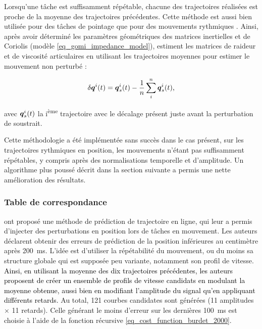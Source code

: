 Lorsqu'une tâche est suffisamment répétable, chacune des trajectoires réalisées est proche de la moyenne des trajectoires précédentes. Cette méthode est aussi bien utilisée pour des tâches de pointage \parencite{gomi_human_1997} que pour des mouvements rythmiques \parencite{bennett_time-varying_1992}. Ainsi, après avoir déterminé les paramètres géométriques des matrices inertielles et de Coriolis (modèle \cref{eq_gomi_impedance_model}), \textcite{gomi_human_1997} estiment les matrices de raideur et de viscosité articulaires en utilisant les trajectoires moyennes pour estimer le mouvement non perturbé :

\begin{equation}
\delta \vect{q}^i(t) = \vect{q}^i_s(t) - \frac{1}{n} \sum_{i}^{n} \vect{q}^i_s(t) \text{,}
\end{equation}

avec $ \vect{q}^i_s(t) $ la i\textsuperscript{ème} trajectoire avec le décalage présent juste avant la perturbation de soustrait. 

Cette méthodologie a été implémentée sans succès dans le cas présent, sur les trajectoires rythmiques en position, les mouvements n'étant pas suffisamment répétables, y compris après des normalisations temporelle et d'amplitude. Un algorithme plus poussé décrit dans la section suivante a permis une nette amélioration des résultats.

\subsubsection{Table de correspondance} \label{chap3_sec_method_sub_virt_traj_2}

\textcite{burdet_method_2000} ont proposé une méthode de prédiction de trajectoire en ligne, qui leur a permis d'injecter des perturbations en position lors de tâches en mouvement. Les auteurs déclarent obtenir des erreurs de prédiction de la position inférieures au centimètre après \SI{200}{\milli\second}. L'idée est d'utiliser la répétabilité du mouvement, ou du moins sa structure globale qui est supposée peu variante, notamment son profil de vitesse. %
\textcolor{black}{Ainsi, en utilisant la moyenne des dix trajectoires précédentes, les auteurs proposent de créer un ensemble de profils de vitesse candidats en modulant la moyenne obtenue, aussi bien en modifiant l’amplitude du signal qu’en appliquant différents retards.} Au total, 121 courbes candidates sont générées (11 amplitudes $\times$ 11 retards). Celle générant le moins d'erreur sur les dernières \SI{100}{\milli\second} est choisie à l'aide de la fonction récursive \cref{eq_cost_function_burdet_2000}.

